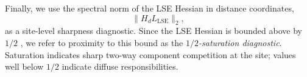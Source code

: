 Finally, we use the spectral norm of the LSE Hessian in distance coordinates,
\[
    \|H_d L_{\mathrm{LSE}}\|_2,
\]
as a site-level sharpness diagnostic. Since the LSE Hessian is bounded above
by $1/2$ \citep{bohning1992multinomial}, we refer to proximity to this bound
as the \emph{$1/2$-saturation diagnostic}. Saturation indicates sharp two-way
component competition at the site; values well below $1/2$ indicate diffuse
responsibilities.
